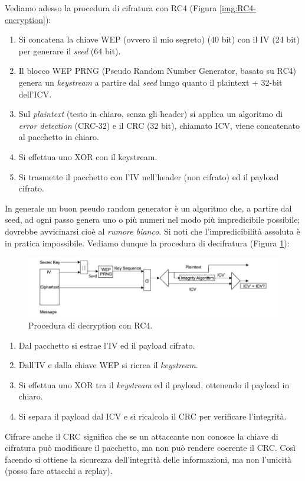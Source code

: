 Vediamo adesso la procedura di cifratura con RC4 (Figura \ref{img:RC4-encryption}):
\begin{enumerate}
	\item Si concatena la chiave WEP (ovvero il mio segreto) (40 bit) con il IV (24 bit) per generare il \textit{seed} (64 bit).
	\item Il blocco WEP PRNG (Pseudo Random Number Generator, basato su RC4) genera un \textit{keystream} a partire dal \textit{seed} lungo quanto il plaintext + 32-bit dell'ICV.
	\item Sul \textit{plaintext} (testo in chiaro, senza gli header) si applica un algoritmo di \textit{error detection} (CRC-32) e il CRC (32 bit), chiamato ICV, viene concatenato al pacchetto in chiaro.
	\item Si effettua uno XOR con il keystream.
	\item Si trasmette il pacchetto con l'IV nell'header (non cifrato) ed il payload cifrato.
\end{enumerate}
In generale un buon pseudo random generator è un algoritmo che, a partire dal seed, ad ogni passo genera uno o più numeri nel modo più impredicibile possibile; dovrebbe avvicinarsi cioè al \textit{rumore bianco}. Si noti che l'impredicibilità assoluta è in pratica impossibile. Vediamo dunque la procedura di decifratura (Figura \ref{img:RC4-decryption}):
\begin{figure}[htbp]
	\centering
	\includegraphics[scale = 0.5]{images/RC4-decryption}
	\caption{Procedura di decryption con RC4.}
	\label{img:RC4-decryption}
\end{figure}
\begin{enumerate}
	\item Dal pacchetto si estrae l'IV ed il payload cifrato.
	\item Dall'IV e dalla chiave WEP si ricrea il \textit{keystream}.
	\item Si effettua uno XOR tra il \textit{keystream} ed il payload, ottenendo il payload in chiaro.
	\item Si separa il payload dal ICV e si ricalcola il CRC per verificare l'integrità.
\end{enumerate}
Cifrare anche il CRC significa che se un attaccante non conosce la chiave di cifratura può modificare il pacchetto, ma non può rendere coerente il CRC. Così facendo si ottiene la sicurezza dell'integrità delle informazioni, ma non l'unicità (posso fare attacchi a replay). 
